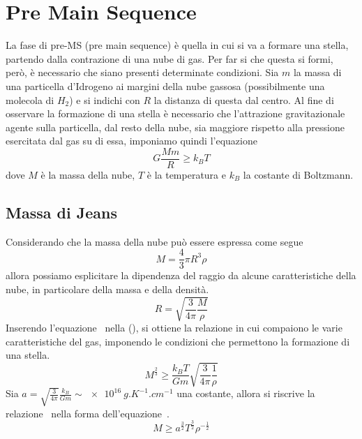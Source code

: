 \section{Pre Main Sequence}\label{sec:pre-main-sequence}

La fase di pre-MS (pre main sequence) è quella in cui si va a formare una stella, partendo dalla contrazione di una nube di gas. Per far si che questa si formi, però, è necessario che siano presenti determinate condizioni. Sia $m$ la massa di una particella d'Idrogeno ai margini della nube gassosa (possibilmente una molecola di $H_2$) e si indichi con $R$ la distanza di questa dal centro. Al fine di osservare la formazione di una stella è necessario che l'attrazione gravitazionale agente sulla particella, dal resto della nube, sia maggiore rispetto alla pressione esercitata dal gas su di essa, imponiamo quindi l'equazione~
\begin{equation}
    G \frac{M m}{R} \geq k_B T
    \label{eq:1}
\end{equation}
dove $M$ è la massa della nube, $T$ è la temperatura e $k_B$ la costante di Boltzmann.
\subsection{Massa di Jeans}\label{sec:massa-jeans}

Considerando che la massa della nube può essere espressa come segue
\[
    M = \frac{4}{3} \pi R^3 \rho
\]
allora possiamo esplicitare la dipendenza del raggio da alcune caratteristiche della nube, in particolare della massa e della densità.
\begin{equation}
    R = \sqrt{\frac{3}{4\pi} \frac{M}{\rho}}
    \label{eq:2}
\end{equation}
Inserendo l'equazione~ nella (), si ottiene la relazione in cui compaiono le varie caratteristiche del gas, imponendo le condizioni che permettono la formazione di una stella.
\begin{equation}
    M^{\frac{2}{3}} \geq \frac{k_B T}{G m} \sqrt{\frac{3}{4\pi} \frac{1}{\rho}}
    \label{eq:3}
\end{equation}
Sia $a = \sqrt{\frac{3}{4\pi}}\frac{k_B}{G m} \sim \SI{e16}{g.K^{-1}.cm^{-1}}$ una costante, allora si riscrive la relazione~ nella forma dell'equazione~.
\begin{equation}
    M \geq a^{\frac{3}{2}} T^{\frac{3}{2}} \rho^{-\frac{1}{2}}
\label{eq:jeans}
\end{equation}


